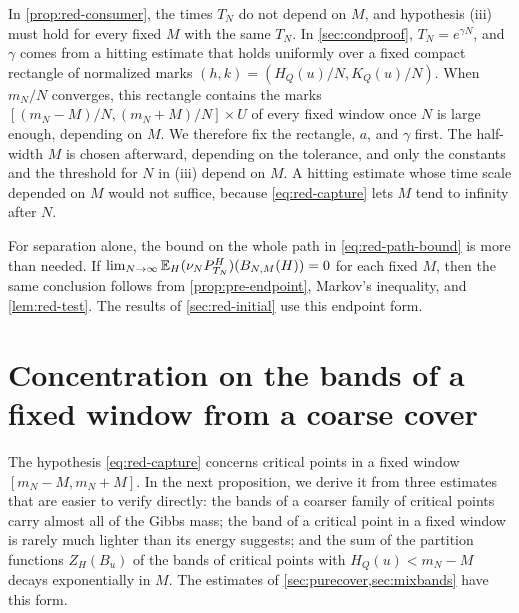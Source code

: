 \begin{remark}\label{rem:red-order}
In \cref{prop:red-consumer}, the times $T_N$ do not depend on $M$, and hypothesis (iii) must hold for every fixed $M$ with the same $T_N$. In \cref{sec:condproof}, $T_N=e^{\gamma N}$, and $\gamma$ comes from a hitting estimate that holds uniformly over a fixed compact rectangle of normalized marks $(h,k)=(H_Q(u)/N,K_Q(u)/N)$. When $m_N/N$ converges, this rectangle contains the marks $[(m_N-M)/N,(m_N+M)/N]\times U$ of every fixed window once $N$ is large enough, depending on $M$. We therefore fix the rectangle, $a$, and $\gamma$ first. The half-width $M$ is chosen afterward, depending on the tolerance, and only the constants and the threshold for $N$ in (iii) depend on $M$. A hitting estimate whose time scale depended on $M$ would not suffice, because \eqref{eq:red-capture} lets $M$ tend to infinity after $N$.
\end{remark}

\begin{remark}\label{rem:red-endpoint}
For separation alone, the bound on the whole path in \eqref{eq:red-path-bound} is more than needed. If $\lim_{N\to\infty}\mathbb E_H(\nu_NP^H_{T_N})(B_{N,M}(H))=0$ for each fixed $M$, then the same conclusion follows from \cref{prop:pre-endpoint}, Markov's inequality, and \cref{lem:red-test}. The results of \cref{sec:red-initial} use this endpoint form.
\end{remark}

\section{Concentration on the bands of a fixed window from a coarse cover}\label{sec:red-capture}

The hypothesis \eqref{eq:red-capture} concerns critical points in a fixed window $[m_N-M,m_N+M]$. In the next proposition, we derive it from three estimates that are easier to verify directly: the bands of a coarser family of critical points carry almost all of the Gibbs mass; the band of a critical point in a fixed window is rarely much lighter than its energy suggests; and the sum of the partition functions $Z_H(B_u)$ of the bands of critical points with $H_Q(u)<m_N-M$ decays exponentially in $M$. The estimates of \cref{sec:purecover,sec:mixbands} have this form.

